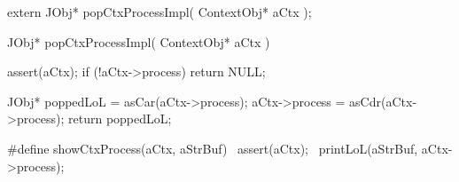 \startCHeader
extern JObj* popCtxProcessImpl(
  ContextObj* aCtx
);
\stopCHeader
{}

\startCCode
JObj* popCtxProcessImpl(
  ContextObj* aCtx
) {
  assert(aCtx);
  if (!aCtx->process) return NULL;

  JObj* poppedLoL = asCar(aCtx->process);
  aCtx->process   = asCdr(aCtx->process);
  return poppedLoL;
}
\stopCCode

\startCHeader
#define showCtxProcess(aCtx, aStrBuf) \
  assert(aCtx);                       \
  printLoL(aStrBuf, aCtx->process);   \
\stopCHeader

